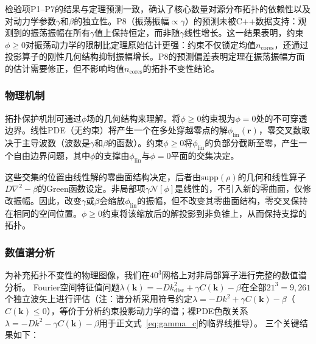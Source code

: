 \documentclass[sn-nature,pdflatex]{sn-jnl}
\begin{document}
检验项P1--P7的结果与定理预测一致，确认了核心数量对源分布拓扑的依赖性以及对动力学参数$\gamma$和$\beta$的独立性。P8（振荡振幅$\propto \gamma$）的预测未被C++数据支持：观测到的振荡振幅在所有$\gamma$值上保持恒定，而非随$\gamma$线性增长。这一结果表明，约束$\phi \ge 0$对振荡动力学的限制比定理原始估计更强：约束不仅锁定均值$n_{\text{cores}}$，还通过投影算子的刚性几何结构抑制振幅增长。P8的预测偏差表明定理在振荡振幅方面的估计需要修正，但不影响均值$n_{\text{cores}}$的拓扑不变性结论。

\subsubsection{物理机制}

拓扑保护机制可通过$\phi$场的几何结构来理解。将$\phi \ge 0$约束视为$\phi = 0$处的不可穿透边界。线性PDE（无约束）将产生一个在多处穿越零点的解$\phi_{\text{lin}}(\mathbf{r})$，零交叉数取决于主导波数（波数是$\gamma$和$\beta$的函数）。约束$\phi \ge 0$将$\phi_{\text{lin}}$的负部分截断至零，产生一个自由边界问题，其中$\phi$的支撑由$\phi_{\text{lin}}$与$\phi = 0$平面的交集决定。

这些交集的位置由线性解的零曲面结构决定，后者由$\text{supp}(\rho)$的几何和线性算子$D\nabla^2 - \beta$的Green函数设定。非局部项$\gamma\mathcal{N}[\phi]$是线性的，不引入新的零曲面，仅修改振幅。因此，改变$\gamma$或$\beta$会缩放$\phi_{\text{lin}}$的振幅，但不改变其零曲面结构，零交叉保持在相同的空间位置。$\phi \ge 0$约束将该缩放后的解投影到非负锥上，从而保持支撑的拓扑。

\subsubsection{数值谱分析}

为补充拓扑不变性的物理图像，我们在$40^3$网格上对非局部算子进行完整的数值谱分析。
Fourier空间特征值问题$\lambda(\mathbf{k}) = -D k^2_{\text{disc}} + \gamma C(\mathbf{k}) - \beta$在全部$21^3 = 9,261$个独立波矢上进行评估（注：谱分析采用符号约定$\lambda = -D k^2 + \gamma C(\mathbf{k}) - \beta$（$C(\mathbf{k}) \le 0$），等价于分析约束投影动力学的谱；裸PDE色散关系$\lambda = -D k^2 - \gamma C(\mathbf{k}) - \beta$用于正文式~\eqref{eq:gamma_c}的临界线推导）。
三个关键结果如下：
\end{document}
